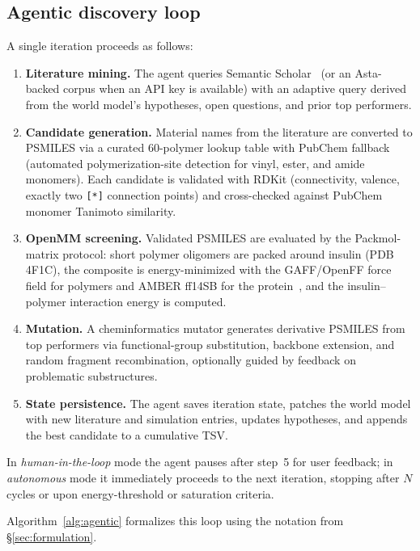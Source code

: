 \documentclass[twocolumn]{fairmeta}
\begin{document}
\subsection{Agentic discovery loop}

A single iteration proceeds as follows:
\begin{enumerate}
\item \textbf{Literature mining.} The agent queries Semantic Scholar~\cite{lo2020s2orc} (or an Asta-backed corpus when an API key is available) with an adaptive query derived from the world model's hypotheses, open questions, and prior top performers.
\item \textbf{Candidate generation.} Material names from the literature are converted to PSMILES via a curated 60-polymer lookup table with PubChem fallback (automated polymerization-site detection for vinyl, ester, and amide monomers). Each candidate is validated with RDKit (connectivity, valence, exactly two \texttt{[*]} connection points) and cross-checked against PubChem monomer Tanimoto similarity.
\item \textbf{OpenMM screening.} Validated PSMILES are evaluated by the Packmol-matrix protocol: short polymer oligomers are packed around insulin (PDB 4F1C), the composite is energy-minimized with the GAFF/OpenFF force field for polymers and AMBER ff14SB for the protein~\cite{he2020amber,maier2015ff14sb,qiu2021development}, and the insulin--polymer interaction energy is computed.
\item \textbf{Mutation.} A cheminformatics mutator generates derivative PSMILES from top performers via functional-group substitution, backbone extension, and random fragment recombination, optionally guided by feedback on problematic substructures.
\item \textbf{State persistence.} The agent saves iteration state, patches the world model with new literature and simulation entries, updates hypotheses, and appends the best candidate to a cumulative TSV.
\end{enumerate}
In \emph{human-in-the-loop} mode the agent pauses after step~5 for user feedback; in \emph{autonomous} mode it immediately proceeds to the next iteration, stopping after $N$ cycles or upon energy-threshold or saturation criteria.

Algorithm~\ref{alg:agentic} formalizes this loop using the notation from \S\ref{sec:formulation}.
\end{document}
